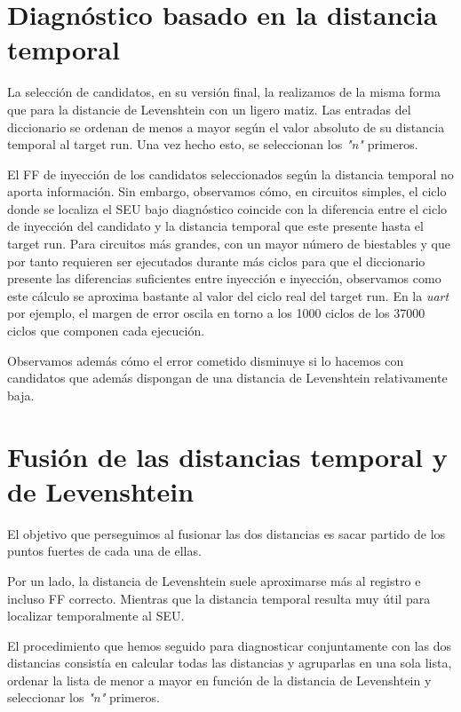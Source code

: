 \section{Diagnóstico basado en la distancia temporal}
\label{sec:CycleCands}
La selección de candidatos, en su versión final, la realizamos de la misma forma 
que para la distancie de Levenshtein con un ligero matiz. Las entradas del
diccionario se ordenan de menos a mayor según el valor absoluto de su distancia
temporal al target run. Una vez hecho esto, se seleccionan los \textit{"n"}
primeros.

El \gls{FF} de inyección de los candidatos seleccionados según la distancia
temporal no aporta información. Sin embargo, observamos cómo, en circuitos
simples, el ciclo donde se localiza el \gls{SEU} bajo diagnóstico coincide con 
la diferencia entre el ciclo de inyección del candidato y la distancia temporal 
que este presente hasta el target run. Para circuitos más grandes, con un mayor
número de biestables y que por tanto requieren ser ejecutados durante más ciclos
para que el diccionario presente las diferencias suficientes entre inyección e
inyección, observamos como este cálculo se aproxima bastante al valor del ciclo
real del target run. En la \textit{uart} por ejemplo, el margen de error oscila
en torno a los 1000 ciclos de los 37000 ciclos que componen cada ejecución.

Observamos además cómo el error cometido disminuye si lo hacemos con candidatos
que además dispongan de una distancia de Levenshtein relativamente baja.


\section{Fusión de las distancias temporal y de Levenshtein}
\label{sec:FusionLevenCycle}
El objetivo que perseguimos al fusionar las dos distancias es sacar partido de los
puntos fuertes de cada una de ellas.

Por un lado, la distancia de Levenshtein suele aproximarse más al registro e
incluso \gls{FF} correcto. Mientras que la distancia temporal resulta muy útil
para localizar temporalmente al \gls{SEU}.

El procedimiento que hemos seguido para diagnosticar conjuntamente con las dos
distancias consistía en calcular todas las distancias y agruparlas en una sola
lista, ordenar la lista de menor a mayor en función de la distancia de
Levenshtein y seleccionar los \textit{"n"} primeros.


